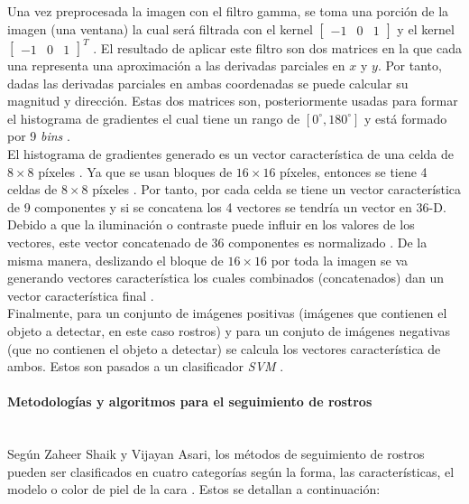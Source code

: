 \documentclass[a4paper,openright,12pt]{report}
\begin{document}
Una vez preprocesada la imagen con el filtro gamma, se toma una porción de la
imagen (una ventana) la cual será filtrada con el kernel
$[\begin{matrix}-1 & 0 & 1\end{matrix}]$ y el kernel
$[\begin{matrix}-1 & 0 & 1\end{matrix}]^T$ \cite{dalal2005histograms}.
El resultado de aplicar este filtro son dos matrices en la que cada una
representa una aproximación a las derivadas parciales en $x$ y $y$.
Por tanto, dadas las derivadas parciales en ambas coordenadas se puede calcular
su magnitud y dirección. Estas dos matrices son, posteriormente usadas para
formar el histograma de gradientes el cual tiene un rango de
$[0^\circ, 180^\circ]$ y está formado por 9 \textit{bins}
\cite{dalal2005histograms}.\\

El histograma de gradientes generado es un vector característica de una celda
de $8 \times 8$ píxeles \cite{dalal2005histograms}. Ya que se usan bloques de
$16 \times 16$ píxeles, entonces se tiene 4 celdas de $8 \times 8$ píxeles
\cite{dalal2005histograms}. Por tanto, por cada celda se tiene un vector
característica de 9 componentes y si se concatena los 4 vectores se tendría un
vector en 36-D. Debido a que la iluminación o contraste puede influir 
en los valores de los vectores, este vector concatenado de 36 componentes es
normalizado \cite{dalal2005histograms}. De la misma manera, deslizando el
bloque de $16 \times 16$ por toda la imagen se va generando vectores
característica los cuales combinados (concatenados) dan un vector característica
final \cite{dalal2005histograms}.\\
Finalmente, para un conjunto de imágenes positivas (imágenes que contienen el
objeto a detectar, en este caso rostros) y para un conjuto de imágenes negativas
(que no contienen el objeto a detectar) se calcula los vectores característica
de ambos. Estos son pasados a un clasificador \textit{SVM}
\cite{dalal2005histograms}.

\paragraph{Metodologías y algoritmos para el seguimiento de rostros}\mbox{} \\
Según Zaheer Shaik y Vijayan Asari, los métodos de seguimiento de rostros
pueden ser clasificados en cuatro categorías según la forma, las características,
el modelo o color de piel de la cara \cite{shaik2007robust}. Estos se detallan
a continuación:
\end{document}
